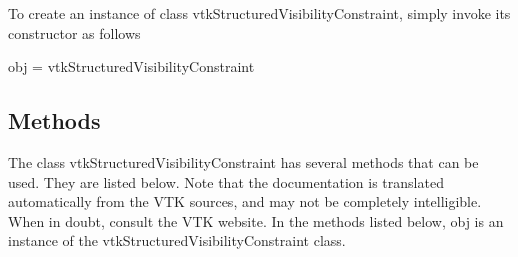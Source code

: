 To create an instance of class vtk\-Structured\-Visibility\-Constraint, simply invoke its constructor as follows \begin{DoxyVerb}  obj = vtkStructuredVisibilityConstraint
\end{DoxyVerb}
 \hypertarget{vtkwidgets_vtkxyplotwidget_Methods}{}\subsection{Methods}\label{vtkwidgets_vtkxyplotwidget_Methods}
The class vtk\-Structured\-Visibility\-Constraint has several methods that can be used. They are listed below. Note that the documentation is translated automatically from the V\-T\-K sources, and may not be completely intelligible. When in doubt, consult the V\-T\-K website. In the methods listed below, {\ttfamily obj} is an instance of the vtk\-Structured\-Visibility\-Constraint class. 

